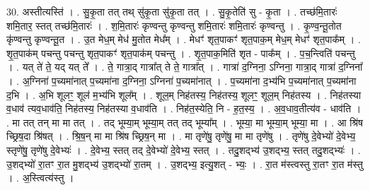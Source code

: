 \documentclass[17pt]{extarticle}
\begin{document}
30. अस्तीत्यस्ति॑ । . सु॒कृ॒ता तत् तथ् सु॑कृ॒ता सु॑कृ॒ता तत् । . सु॒कृ॒तेति॑ सु - कृ॒ता । . तच्छ॑मि॒तारः॑ शमि॒तार॒ स्तत् तच्छ॑मि॒तारः॑ । . श॒मि॒तारः॑ कृण्वन्तु कृण्वन्तु शमि॒तारः॑ शमि॒तारः॑ कृण्वन्तु । . कृ॒ण्व॒न्तू॒तोत कृ॑ण्वन्तु कृण्वन्तू॒त । . उ॒त मेध॒म् मेध॑ मु॒तोत मेध᳚म् । . मेधꣳ॑ शृत॒पाकꣳ॑ शृत॒पाक॒म् मेध॒म् मेधꣳ॑ शृत॒पाक᳚म् । . शृ॒त॒पाक॑म् पचन्तु पचन्तु शृत॒पाकꣳ॑ शृत॒पाक॑म् पचन्तु । . शृ॒त॒पाक॒मिति॑ शृत - पाक᳚म् । . प॒च॒न्त्विति॑ पचन्तु । . यत् ते॑ ते॒ यद् यत् ते᳚ । . ते॒ गात्रा॒द् गात्रा᳚त् ते ते॒ गात्रा᳚त् । . गात्रा॑ द॒ग्निना॒ ऽग्निना॒ गात्रा॒द् गात्रा॑ द॒ग्निना᳚ । . अ॒ग्निना॑ प॒च्यमा॑नात् प॒च्यमा॑ना द॒ग्निना॒ ऽग्निना॑ प॒च्यमा॑नात् । . प॒च्यमा॑ना द॒भ्य॑भि प॒च्यमा॑नात् प॒च्यमा॑ना द॒भि । . अ॒भि शूलꣳ॒॒ शूल॑ म॒भ्य॑भि शूल᳚म् । . शूल॒म् निह॑तस्य॒ निह॑तस्य॒ शूलꣳ॒॒ शूल॒म् निह॑तस्य । . निह॑तस्या व॒धाव॑ त्यव॒धाव॑ति॒ निह॑तस्य॒ निह॑तस्या व॒धाव॑ति । . निह॑त॒स्येति॒ नि - ह॒त॒स्य॒ । . अ॒व॒धाव॒तीत्य॑व - धाव॑ति । . मा तत् तन् मा मा तत् । . तद् भूम्या॒म् भूम्या॒म् तत् तद् भूम्या᳚म् । . भूम्या॒ मा भूम्या॒म् भूम्या॒ मा । . आ श्रि॑ष च्छ्रिष॒दा श्रि॑षत् । . श्रि॒ष॒न् मा मा श्रि॑ष च्छ्रिष॒न् मा । . मा तृणे॑षु॒ तृणे॑षु॒ मा मा तृणे॑षु । . तृणे॑षु दे॒वेभ्यो॑ दे॒वेभ्य॒ स्तृणे॑षु॒ तृणे॑षु दे॒वेभ्यः॑ । . दे॒वेभ्य॒ स्तत् तद् दे॒वेभ्यो॑ दे॒वेभ्य॒ स्तत् । . तदु॒शद्भ्य॑ उ॒शद्भ्य॒ स्तत् तदु॒शद्भ्यः॑ । . उ॒शद्भ्यो॑ रा॒तꣳ रा॒त मु॒शद्भ्य॑ उ॒शद्भ्यो॑ रा॒तम् । . उ॒शद्भ्य॒ इत्यु॒शत् - भ्यः॒ । . रा॒त म॑स्त्वस्तु रा॒तꣳ रा॒त म॑स्तु । . अ॒स्त्वित्य॑स्तु । \newline
\end{document}
